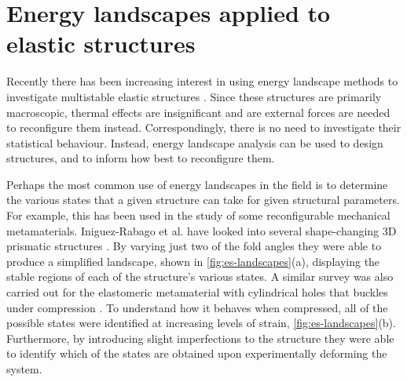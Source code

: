 \section{Energy landscapes applied to elastic structures}
Recently there has been increasing interest in using energy landscape methods to investigate multistable elastic structures \cite{Iniguez-Rabago2019,Medina2020,Silverberg2015,Zhai2018,Hutchinson2018,Virot2017,Panter2019}.
Since these structures are primarily macroscopic, thermal effects are insignificant and are external forces are needed to reconfigure them instead.
Correspondingly, there is no need to investigate their statistical behaviour.
Instead, energy landscape analysis can be used to design structures, and to inform how best to reconfigure them.

Perhaps the most common use of energy landscapes in the field is to determine the various states that a given structure can take for given structural parameters.
For example, this has been used in the study of some reconfigurable mechanical metamaterials.
Iniguez-Rabago et al. have looked into several shape-changing 3D prismatic structures \cite{Iniguez-Rabago2019}.
By varying just two of the fold angles they were able to produce a simplified landscape, shown in \cref{fig:es-landscapes}(a), displaying the stable regions of each of the structure's various states.
A similar survey was also carried out for the elastomeric metamaterial with cylindrical holes that buckles under compression \cite{Medina2020}.
To understand how it behaves when compressed, all of the possible states were identified at increasing levels of strain, \cref{fig:es-landscapes}(b).
Furthermore, by introducing slight imperfections to the structure they were able to identify which of the states are obtained upon experimentally deforming the system.


